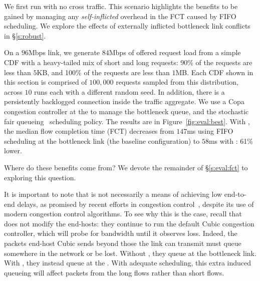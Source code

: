 We first run \name with no cross traffic.
This scenario highlights the benefits to be gained by managing any \emph{self-inflicted} overhead in the FCT caused by FIFO scheduling. 
We explore the effects of externally inflicted bottleneck link conflicts in \S\ref{s:robust}.


On a $96$Mbps link, we generate $84$Mbps of offered request load from a simple  CDF with a heavy-tailed mix of short and long requests: 90\% of the requests are less than $5$KB, and 100\% of the requests are less than $1$MB. 
Each CDF shown in this section is comprised of $100,000$ requests sampled from this distribution, across $10$ runs each with a different random seed.
In addition, there is a persistently backlogged connection inside the traffic aggregate.
We use a Copa~\cite{copa} congestion controller at the \inbox to manage the bottleneck queue, and the stochastic fair queueing~\cite{sfq} scheduling policy. 
The results are in Figure~\ref{fig:eval:best}.
With \name, the median flow completion time (FCT) decreases from $147$ms using FIFO scheduling at the bottleneck link (the baseline configuration) to $58$ms with \name: 61\% lower.

Where do these benefits come from? We devote the remainder of \S\ref{s:eval:fct} to exploring this question.

 It is important to note that \name is not necessarily a means of achieving low end-to-end delays, as promised by recent efforts in congestion control~\cite{copa, nimbus}, despite its use of modern congestion control algorithms. 
To see why this is the case, recall that \name does not modify the end-hosts: they continue to run the default Cubic congestion controller, which will probe for bandwidth until it observes loss.
Indeed, the packets end-host Cubic sends beyond those the link can transmit must queue somewhere in the network or be lost. Without \name, they queue at the bottleneck link.
With \name, they instead queue at the \inbox.
With adequate scheduling, this extra induced queueing will affect packets from the long flows rather than short flows.

